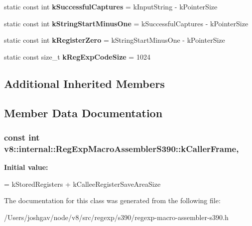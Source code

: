 \begin{DoxyCompactItemize}
\item 
static const int {\bfseries k\+Successful\+Captures} = k\+Input\+String -\/ k\+Pointer\+Size\hypertarget{classv8_1_1internal_1_1_reg_exp_macro_assembler_s390_a04c1d7ca0f8448429893c155f47191b7}{}\label{classv8_1_1internal_1_1_reg_exp_macro_assembler_s390_a04c1d7ca0f8448429893c155f47191b7}

\item 
static const int {\bfseries k\+String\+Start\+Minus\+One} = k\+Successful\+Captures -\/ k\+Pointer\+Size\hypertarget{classv8_1_1internal_1_1_reg_exp_macro_assembler_s390_a8a4dd07fa3f79669a7b436d9e23b2990}{}\label{classv8_1_1internal_1_1_reg_exp_macro_assembler_s390_a8a4dd07fa3f79669a7b436d9e23b2990}

\item 
static const int {\bfseries k\+Register\+Zero} = k\+String\+Start\+Minus\+One -\/ k\+Pointer\+Size\hypertarget{classv8_1_1internal_1_1_reg_exp_macro_assembler_s390_a83cc3c7433144453fe233a6495c4a200}{}\label{classv8_1_1internal_1_1_reg_exp_macro_assembler_s390_a83cc3c7433144453fe233a6495c4a200}

\item 
static const size\+\_\+t {\bfseries k\+Reg\+Exp\+Code\+Size} = 1024\hypertarget{classv8_1_1internal_1_1_reg_exp_macro_assembler_s390_a7a25b0ab0078b9572ac9c32fc275a56c}{}\label{classv8_1_1internal_1_1_reg_exp_macro_assembler_s390_a7a25b0ab0078b9572ac9c32fc275a56c}

\end{DoxyCompactItemize}
\subsection*{Additional Inherited Members}


\subsection{Member Data Documentation}
\subsubsection[{\texorpdfstring{k\+Caller\+Frame}{kCallerFrame}}]{\setlength{\rightskip}{0pt plus 5cm}const int v8\+::internal\+::\+Reg\+Exp\+Macro\+Assembler\+S390\+::k\+Caller\+Frame\hspace{0.3cm}{\ttfamily [static]}, {\ttfamily [private]}}\hypertarget{classv8_1_1internal_1_1_reg_exp_macro_assembler_s390_a07ea76a5721747c844a72301f5913293}{}\label{classv8_1_1internal_1_1_reg_exp_macro_assembler_s390_a07ea76a5721747c844a72301f5913293}
{\bfseries Initial value\+:}
\begin{DoxyCode}
=
      kStoredRegisters + kCalleeRegisterSaveAreaSize
\end{DoxyCode}


The documentation for this class was generated from the following file\+:\begin{DoxyCompactItemize}
\item 
/\+Users/joshgav/node/v8/src/regexp/s390/regexp-\/macro-\/assembler-\/s390.\+h\end{DoxyCompactItemize}
